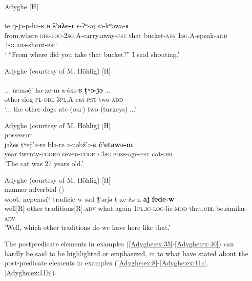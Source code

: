\documentclass[output=paper,colorlinks,citecolor=brown, draft]{langscibook}
\begin{document}
\ea\label{Adyghe:ex:37}
Adyghe \citep[219]{hohlig1997kontaktbedingter} [H] \\
 \\
\gll te q-jə-p-hə-ʁ \textbf{a} \textbf{š'aλe-r} s-ʔʷ-əj sə-kʷəwa-ʁ \\
from.where \textsc{dir-}\textsc{loc-}\textsc{2sg.A}-carry.away\textsc{-pst} that bucket\textsc{-abs} \textsc{1sg.A}-speak\textsc{-add} \textsc{1sg.}\textsc{abs-}shout\textsc{-pst} \\
\glt ` ``From where did you take that bucket?'' I said shouting.'
\z

\ea\label{Adyghe:ex:38}
Adyghe (courtesy of M. Höhlig) [H] \\
 \\
\gll ... neməč̣' ha-xe-m a-šxə-ʁ \textbf{ṭʷə-jə} ... \\
{} other dog\textsc{-pl}\textsc{-obl} \textsc{3pl.A-}eat\textsc{-pst} two\textsc{-add} \\
 `... the other dogs ate (our) two (turkeys) ...' 
\z
 
\newpage
\ea\label{Adyghe:ex:39}
Adyghe (courtesy of M. Höhlig) [H] \\
possessor \\
\gll jəλes ṭʷeč̣'ə-re blə-re ə-nəbž'ə-ʁ \textbf{č'etəwə-m} \\
year twenty\textsc{-coord} seven\textsc{-coord} \textsc{3sg.}\textsc{poss-}age\textsc{-pst} cat\textsc{-obl} \\
 `The cat was 27 years old.'
\z

\ea\label{Adyghe:ex:40}
Adyghe (courtesy of M. Höhlig) [H] \\
manner adverbial () \\
\gll woot, nepeməč̣' tradicie-w səd ǯ'ərjə t-xe-λə-n \textbf{aj} \textbf{fede-w} \\
well[R] other traditions[R]\textsc{-adv} what again \textsc{1pl.}\textsc{io-}\textsc{loc-}lie\textsc{-mod} that\textsc{.obl} be.similar\textsc{-adv}  \\
 `Well, which other traditions do we have here like that.' 
\z

The postpredicate elements in examples (\ref{Adyghe:ex:35}-\ref{Adyghe:ex:40}) can hardly be said to be highlighted or emphasized, in  to what \citet[91]{jakovlev1941grammatika} have stated about the post-predicate elements in examples (\ref{Adyghe:ex:8}-\ref{Adyghe:ex:11a}, \ref{Adyghe:ex:11b}). 
\end{document}
